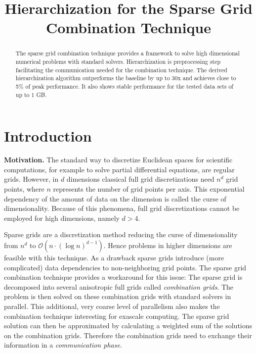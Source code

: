 \documentclass[letterpaper]{article}
\title{Hierarchization for the Sparse Grid Combination Technique
}
\newcommand{\mypar}[1]{{\bf #1.}}
\begin{document}
\maketitle

	\begin{abstract}
		The sparse grid combination technique provides a framework to solve high dimensional numerical problems with standard solvers. 
		Hierarchization is preprocessing step facilitating the communication needed for the combination technique. 
		The derived hierarchization algorithm outperforms the baseline by up to 30x and achieves close to 5\% of peak performance. It also shows stable performance for the tested data sets of up to 1 GB.


\end{abstract}
	
	\section{Introduction}\label{sec:intro}

		\mypar{Motivation}
			 The standard way to discretize Euclidean spaces for scientific computations, for example to solve partial differential equations, are regular grids. However, in $d$ dimensions classical full grid discretizations need $n^d$ grid points, where $n$ represents the number of grid points per axis. This exponential dependency of the amount of data on the dimension is called the curse of dimensionality. Because of this phenomena, full grid discretizations cannot be employed for high dimensions, namely \mbox{$ d>4$}. 


			Sparse grids \cite{smolyak63quadrature, zenger91sparse, bungartz04sparseGrids} are a discretization method reducing the curse of dimensionality from  $n^d$ to  $\mathcal{O}\left(n \cdot \left(\log n\right)^{d-1}\right) $. Hence problems in higher dimensions are feasible with this technique.  As a drawback sparse grids introduce (more complicated) data dependencies to non-neighboring grid points.
			The sparse grid combination technique \cite{griebel92CombiTechnique} provides a workaround for this issue: The sparse grid is decomposed into several anisotropic full grids called \emph{combination grids}. The problem is then solved on these combination grids with standard solvers in parallel. This additional, very coarse level of parallelism also makes the combination technique interesting for exascale computing.
			The sparse grid solution can then be approximated by calculating a weighted sum of the solutions on the combination grids. Therefore the combination grids need to exchange their information in a \emph{communication phase}.
			
\end{document}
